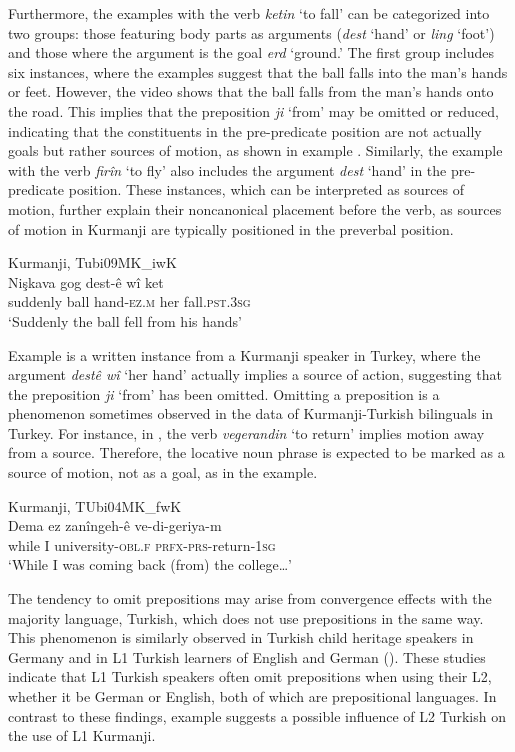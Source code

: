 Furthermore, the examples with the verb \textit{ketin} ‘to fall’ can be categorized into two groups: those featuring body parts as arguments (\textit{dest} ‘hand’ or \textit{ling} ‘foot’) and those where the argument is the goal \textit{erd} ‘ground.’ The first group includes six instances, where the examples suggest that the ball falls into the man's hands or feet. However, the video shows that the ball falls from the man's hands onto the road. This implies that the preposition \textit{ji} ‘from’ may be omitted or reduced, indicating that the constituents in the pre-predicate position are not actually goals but rather sources of motion, as shown in example . Similarly, the example with the verb \textit{firîn} ‘to fly’ also includes the argument \textit{dest} ‘hand’ in the pre-predicate position. These instances, which can be interpreted as sources of motion, further explain their noncanonical placement before the verb, as sources of motion in Kurmanji are typically positioned in the preverbal position.

\ea
  \label{ex:key:60} Kurmanji, Tubi09MK\_iwK \\
     \gll Nişkava   gog   dest-ê     wî   ket \\
suddenly  ball  hand-\textsc{ez.m}  her  fall.\textsc{pst.3sg}\\
\glt ‘Suddenly the ball fell from his hands’ 
  \z

Example  is a written instance from a Kurmanji speaker in Turkey, where the argument \textit{destê wî} ‘her hand’ actually implies a source of action, suggesting that the preposition \textit{ji} ‘from’ has been omitted. Omitting a preposition is a phenomenon sometimes observed in the data of Kurmanji-Turkish bilinguals in Turkey. For instance, in , the verb \textit{vegerandin} ‘to return’ implies motion away from a source. Therefore, the locative noun phrase is expected to be marked as a source of motion, not as a goal, as in the example.

\ea
  \label{ex:key:61} Kurmanji, TUbi04MK\_fwK \\
\gll Dema    ez     zanîngeh-ê          ve-di-geriya-m\\
while    I      university\textsc{-obl.f}     \textsc{prfx-prs-}return-\textsc{1sg}\\
\glt ‘While I was coming back (from) the college…’ 
  \z

The tendency to omit prepositions may arise from convergence effects with the majority language, Turkish, which does not use prepositions in the same way. This phenomenon is similarly observed in Turkish child heritage speakers in Germany \citep{Turgay2010} and in L1 Turkish learners of English and German (\citealt{Ozisik2014, Yildiz2016}). These studies indicate that L1 Turkish speakers often omit prepositions when using their L2, whether it be German or English, both of which are prepositional languages. In contrast to these findings, example  suggests a possible influence of L2 Turkish on the use of L1 Kurmanji.


